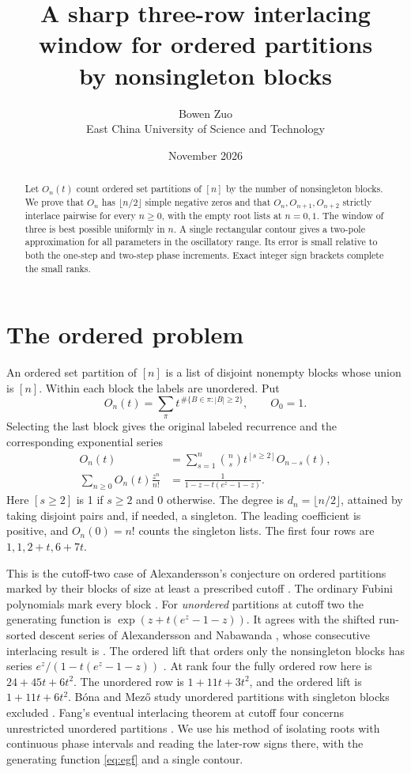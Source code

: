 \documentclass[11pt]{article}
\title{A sharp three-row interlacing window for ordered partitions\\ by nonsingleton blocks}
\author{Bowen Zuo\\[2pt]\small East China University of Science and Technology}
\date{November 2026}
\begin{document}
\maketitle
\begin{abstract}
Let \(O_n(t)\) count ordered set partitions of \([n]\) by the number of nonsingleton blocks. We prove that \(O_n\) has \(\lfloor n/2\rfloor\) simple negative zeros and that \(O_n,O_{n+1},O_{n+2}\) strictly interlace pairwise for every \(n\ge0\), with the empty root lists at \(n=0,1\). The window of three is best possible uniformly in \(n\). A single rectangular contour gives a two-pole approximation for all parameters in the oscillatory range. Its error is small relative to both the one-step and two-step phase increments. Exact integer sign brackets complete the small ranks.
\end{abstract}

\section{The ordered problem}

An ordered set partition of \([n]\) is a list of disjoint nonempty blocks whose union is \([n]\). Within each block the labels are unordered. Put
\[
 O_n(t)=\sum_\pi t^{\,\#\{B\in\pi:|B|\ge2\}},\qquad O_0=1.
\]
Selecting the last block gives the original labeled recurrence and the corresponding exponential series
\begin{align}
 O_n(t)&=\sum_{s=1}^n \binom ns t^{[s\ge2]}O_{n-s}(t),\label{eq:rec}\\
 \sum_{n\ge0}O_n(t)\frac{z^n}{n!}&=\frac{1}{1-z-t(e^z-1-z)}.\label{eq:egf}
\end{align}
Here \([s\ge2]\) is 1 if \(s\ge2\) and 0 otherwise. The degree is \(d_n=\lfloor n/2\rfloor\), attained by taking disjoint pairs and, if needed, a singleton. The leading coefficient is positive, and \(O_n(0)=n!\) counts the singleton lists. The first four rows are \(1,1,2+t,6+7t\).

This is the cutoff-two case of Alexandersson's conjecture on ordered partitions marked by their blocks of size at least a prescribed cutoff \cite{alex}. The ordinary Fubini polynomials mark every block \cite[Section~4.3]{fubini}. For \emph{unordered} partitions at cutoff two the generating function is \(\exp(z+t(e^z-1-z))\). It agrees with the shifted run-sorted descent series of Alexandersson and Nabawanda \cite[Theorem~3.2]{runs}, whose consecutive interlacing result is \cite[Theorem~3.3]{runs}. The ordered lift that orders only the nonsingleton blocks has series \(e^z/(1-t(e^z-1-z))\) \cite{lift}. At rank four the fully ordered row here is \(24+45t+6t^2\). The unordered row is \(1+11t+3t^2\), and the ordered lift is \(1+11t+6t^2\). B\'ona and Mez\H{o} study unordered partitions with singleton blocks excluded \cite{bona}. Fang's eventual interlacing theorem at cutoff four concerns unrestricted unordered partitions \cite[Theorem~1]{fang}. We use his method of isolating roots with continuous phase intervals and reading the later-row signs there, with the generating function \eqref{eq:egf} and a single contour.
\end{document}
